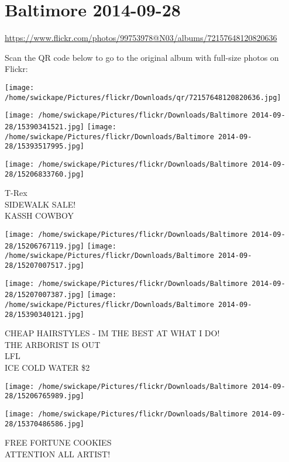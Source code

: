 \documentclass[10pt,letterpaper]{article}
\title{}
\author{}
\date{}
\begin{document}
\section*{Baltimore 2014-09-28}

\url{https://www.flickr.com/photos/99753978@N03/albums/72157648120820636}

Scan the QR code below to go to the original album with full-size photos on Flickr:

\texttt{[image: /home/swickape/Pictures/flickr/Downloads/qr/72157648120820636.jpg]}
\pagebreak

\texttt{[image: /home/swickape/Pictures/flickr/Downloads/Baltimore 2014-09-28/15390341521.jpg]}
\texttt{[image: /home/swickape/Pictures/flickr/Downloads/Baltimore 2014-09-28/15393517995.jpg]}

\vspace{0.25in}
\texttt{[image: /home/swickape/Pictures/flickr/Downloads/Baltimore 2014-09-28/15206833760.jpg]}

T{-}Rex\\
SIDEWALK SALE!\\
KASSH COWBOY
\pagebreak

\texttt{[image: /home/swickape/Pictures/flickr/Downloads/Baltimore 2014-09-28/15206767119.jpg]}
\texttt{[image: /home/swickape/Pictures/flickr/Downloads/Baltimore 2014-09-28/15207007517.jpg]}

\texttt{[image: /home/swickape/Pictures/flickr/Downloads/Baltimore 2014-09-28/15207007387.jpg]}
\texttt{[image: /home/swickape/Pictures/flickr/Downloads/Baltimore 2014-09-28/15390340121.jpg]}

CHEAP HAIRSTYLES {-} IM THE BEST AT WHAT I DO!\\
THE ARBORIST IS OUT\\
LFL\\
ICE COLD WATER \$2
\pagebreak

\texttt{[image: /home/swickape/Pictures/flickr/Downloads/Baltimore 2014-09-28/15206765989.jpg]}

\vspace{0.25in}
\texttt{[image: /home/swickape/Pictures/flickr/Downloads/Baltimore 2014-09-28/15370486586.jpg]}

FREE FORTUNE COOKIES\\
ATTENTION ALL ARTIST!
\pagebreak
\end{document}
